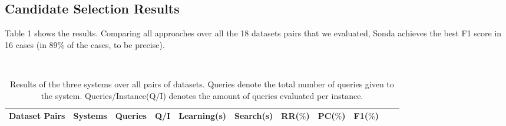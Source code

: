 \subsection{Candidate Selection Results} 
Table 1 shows the results. Comparing all approaches over all the 18 datasets pairs that we evaluated, Sonda achieves the best F1 score in 16 cases (in 89\% of the cases, to be precise).
\begin{center}
\begin{table}[h]
\centering
\scriptsize\tt
\caption{Results of the three systems over all pairs of datasets. Queries denote the total number of queries given to the system. Queries/Instance(Q/I) denotes the amount of queries evaluated per instance.} 
    \begin{tabular}{|c|l|c|c|c|c|c|c|c|c|c|}
        \hline
        Dataset Pairs & Systems & Queries & Q/I & Learning(s) & Search(s)  & RR($\%$) & PC($\%$) &  F1($\%$) \\ \hline


\end{tabular}
\end{table}
\end{center}
